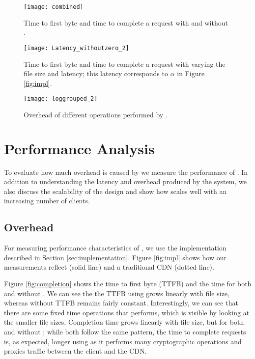\begin{figure*}[t!]
\vspace{-2mm}
  \begin{minipage}[t]{.31\linewidth}
    \centering
     \texttt{[image: combined]}
    \caption{Time to first byte and time to complete a request with and without \system{}.}
    \label{fig:completion}
  \end{minipage}
  \hfill
  \begin{minipage}[t]{.29\linewidth}
    \centering
    \texttt{[image: Latency\_withoutzero\_2]}
    \caption{Time to first byte and time to complete a request with varying the file size and latency; this latency 
corresponds to $\alpha$ in Figure \ref{fig:impl}.}
    \label{fig:latency}
  \end{minipage}
  \hfill
  \begin{minipage}[t]{.35\linewidth}
    \centering
    \texttt{[image: loggrouped\_2]}
\caption{Overhead of different operations performed by \system{}.}
\label{fig:overhead2}
  \end{minipage}
\end{figure*}


\section{Performance Analysis}
\label{sec:performance}
To evaluate how much overhead is caused by \system{} we measure the performance 
of \system{}.  In addition to understanding the latency and overhead produced by the 
system, we also discuss the scalability of the design and show how \system{} scales 
well with an increasing number of clients.

\subsection{\system{} Overhead}
For measuring performance characteristics of \system{}, we use the implementation 
described in Section \ref{sec:implementation}.  Figure \ref{fig:impl} shows 
how our measurements reflect \system{} (solid line) and a traditional CDN (dotted 
line).  

Figure \ref{fig:completion} shows the time to first byte (TTFB) and the time for both \system{} and 
without \system{}.  We can see the the TTFB using \system{} grows linearly with 
file size, whereas without \system{} TTFB remains fairly constant.  Interestingly, 
we can see that there are some fixed time operations that \system{} performs, which 
is visible by looking at the smaller file sizes. Completion time grows linearly with file size, but for both \system{} and without \system{}; while both follow the 
same pattern, the time to complete requests is, as expected, longer using \system{} as it performs many cryptographic operations and proxies traffic between the client and the CDN.

